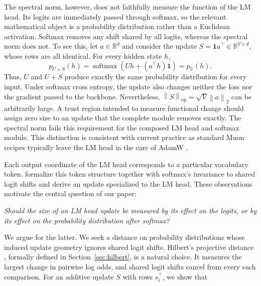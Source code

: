 \documentclass[anon]{opt2026} %
\newcommand{\R}{\mathbb{R}}
\newcommand{\one}{\mathbf{1}}
\newcommand{\norm}[1]{\left\lVert #1\right\rVert}
\DeclareMathOperator{\softmax}{softmax}
\begin{document}
The spectral norm, however, does not faithfully measure the function of the LM head.
Its logits are immediately passed through softmax, so the relevant mathematical object is a probability distribution rather than a Euclidean activation.
Softmax removes any shift shared by all logits, whereas the spectral norm does not. To see this, let $a\in\R^d$ and consider the update
$S=\one a^\top\in\R^{V\times d}$, whose rows are all identical. For every hidden state $h$,
\[
p_{U+S}(h)
=
\softmax\!\left(Uh+(a^\top h)\one\right)
=
p_U(h).
\]
Thus, $U$ and $U+S$ produce exactly the same probability distribution for every input. Under softmax cross entropy, the update also changes neither the loss nor the gradient passed to the backbone.
Nevertheless, $\norm{S}_{\mathrm{op}}=\sqrt{V}\norm{a}_2$ can be arbitrarily large. A trust region intended to measure functional change should assign zero size to an update that the complete module removes exactly.
The spectral norm fails this requirement for the composed LM head and softmax module.
This distinction is consistent with current practice as standard Muon recipes typically leave the LM head in the care of AdamW \citep{loshchilov2018decoupled,jordan2024muon}.

Each output coordinate of the LM head corresponds to a particular vocabulary token.
\citet{lau2026symmetry} formalize this token structure together with softmax's invariance to shared logit shifts and derive an update specialized to the LM head.
These observations motivate the central question of our paper:
\begin{center}
    \emph{Should the size of an LM head update be measured by its effect on
    the logits, or by its effect on the probability distribution after
    softmax?}
\end{center}
We argue for the latter. We seek a distance on probability
distributions whose induced update geometry ignores shared logit shifts.
Hilbert's projective distance \citep{cohen2023hyperbolic}, formally defined in Section~\ref{sec:hilbert}, is a natural choice.
It measures the largest change in pairwise log odds, and shared logit shifts cancel from every such comparison. For an additive update $S$ with rows $s_i^\top$, we show that
\end{document}
